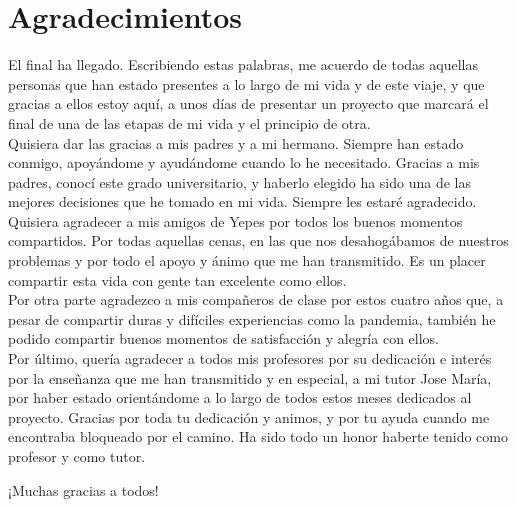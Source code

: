 \chapter*{Agradecimientos}

El final ha llegado. Escribiendo estas palabras, me acuerdo de todas aquellas personas que han estado presentes a lo largo de mi vida y de este viaje, y que gracias a ellos estoy aquí, a unos días de presentar un proyecto que marcará el final de una de las etapas de mi vida y el principio de otra.\\

Quisiera dar las gracias a mis padres y a mi hermano. Siempre han estado conmigo, apoyándome y ayudándome cuando lo he necesitado. Gracias a mis padres, conocí este grado universitario, y haberlo elegido ha sido una de las mejores decisiones que he tomado en mi vida. Siempre les estaré agradecido.\\

Quisiera agradecer a mis amigos de Yepes por todos los buenos momentos compartidos. Por todas aquellas cenas, en las que nos desahogábamos de nuestros problemas y por todo el apoyo y ánimo que me han transmitido. Es un placer compartir esta vida con gente tan excelente como ellos.\\

Por otra parte agradezco a mis compañeros de clase por estos cuatro años que, a pesar de compartir duras y difíciles experiencias como la pandemia, también he podido compartir buenos momentos de satisfacción y alegría con ellos.\\ 

Por último, quería agradecer a todos mis profesores por su dedicación e interés por la enseñanza que me han transmitido y en especial, a mi tutor Jose María, por haber estado orientándome a lo largo de todos estos meses dedicados al proyecto. Gracias por toda tu dedicación y animos, y por tu ayuda cuando me encontraba bloqueado por el camino. Ha sido todo un honor haberte tenido como profesor y como tutor.\\

\begin{center}
	¡Muchas gracias a todos!
\end{center}